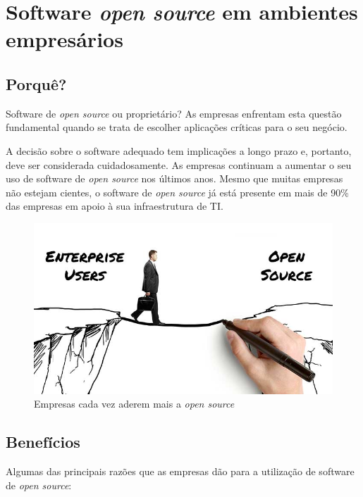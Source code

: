\section{Software \textit{open source} em ambientes empresários} \label{section: aquisição}
\subsection{Porquê?}
Software de \textit{open source} ou proprietário? As empresas enfrentam esta questão fundamental quando se trata de escolher aplicações críticas para o seu negócio.
\par \vspace{6pt}
A decisão sobre o software adequado tem implicações a longo prazo e, portanto, deve ser considerada cuidadosamente. As empresas continuam a aumentar o seu uso de software de \textit{open source} nos últimos anos. Mesmo que muitas empresas não estejam cientes, o software de \textit{open source} já está presente em mais de 90\% das empresas em apoio à sua infraestrutura de TI. \cite{whyOpenSource}

\begin{figure}[H]
  \centering
  \includegraphics[scale=0.65]{Figures/0. General/enterprise_open_source.jpg}
  \caption{Empresas cada vez aderem mais a \textit{open source}}
  \label{Empresas cada vez aderem mais a open source}
\end{figure}

\subsection{Benefícios}
Algumas das principais razões que as empresas dão para a utilização de software de \textit{open source}: \cite{stateOfEnterpriseOpenSource}

